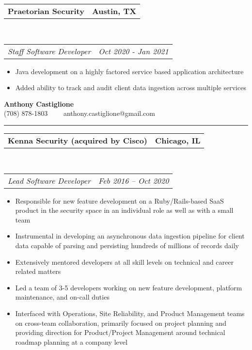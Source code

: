 \documentclass[10pt,letterpaper]{article}
\makeatletter
\newcommand{\headerrow}[2]
{\begin{tabular*}{\linewidth}{l@{\extracolsep{\fill}}r}
  #1 &
  #2 \\
\end{tabular*}}
\newenvironment{indentsection}[1]%
{\begin{list}{}%
  {\setlength{\leftmargin}{#1}}%
  \item[]%
}
{\end{list}}
\makeatother
\begin{document}
\begin{indentsection}{\parindent}
  \headerrow
    {\textbf{Praetorian Security} }
    {\textbf{Austin, TX}}
  \\
  \headerrow
    {\emph{Staff Software Developer}}
    {\emph{Oct 2020 - Jan 2021}}

  \begin{itemize}
  \renewcommand{\labelitemi}{$-$}
  \vspace{-0.1in}
    \item Java development on a highly factored service based application architecture
    \item Added ability to track and audit client data ingestion across multiple services
  \end{itemize}
\end{indentsection}
\pagebreak
\begin{center}
  {\LARGE \textbf {Anthony Castiglione}} \\ (708) 878-1803 \ \ \textbullet \ \ anthony.castiglione@gmail.com
\end{center}
\hrule
\begin{indentsection}{\parindent}
  \headerrow
    {\textbf{Kenna Security (acquired by Cisco)} }
    {\textbf{Chicago, IL}}
  \\
  \headerrow
    {\emph{Lead Software Developer}}
    {\emph{Feb 2016 -- Oct 2020}}

  \begin{itemize}
  \renewcommand{\labelitemi}{$-$}
  \vspace{-0.1in}
    \item Responsible for new feature development on a Ruby/Rails-based SaaS product in the security space in an individual role as well as with a small team
    \item Instrumental in developing an asynchronous data ingestion pipeline for client data capable of parsing and persisting hundreds of millions of records daily
    \item Extensively mentored developers at all skill levels on technical and career related matters
    \item Led a team of 3-5 developers working on new feature development, platform maintenance, and on-call duties
    \item Interfaced with Operations, Site Reliability, and Product Management teams on cross-team collaboration, primarily focused on project planning and providing direction for Product/Project Management around technical roadmap planning at a company level
  \end{itemize}
\end{indentsection}
\end{document}
